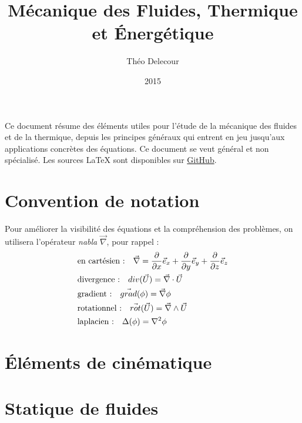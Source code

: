 \documentclass[10pt,a4paper,twocolumn,fleqn]{article}
\title{Mécanique des Fluides, Thermique et Énergétique}
\author{Théo Delecour}
\date{2015}
\begin{document}
\makeatletter

\begin{center}
    \LARGE \@title

    \Large \@author
\end{center}

\makeatother

Ce document résume des éléments utiles pour l'étude de la mécanique des fluides et de la thermique, depuis les principes généraux qui entrent en jeu jusqu'aux applications concrètes des équations. Ce document se veut général et non spécialisé. Les sources \LaTeX{} sont disponibles sur \href{https://github.com/theolamayo/flui-ther-fr}{GitHub}.



\section*{Convention de notation}
Pour améliorer la visibilité des équations et la compréhension des problèmes, on utilisera l'opérateur \textit{nabla} $\vec{\nabla}$, pour rappel :
%
\begin{align}
    \notag &\text{en cartésien :} \quad \vec{\nabla} = \frac{\partial}{\partial x} \vec{e}_x + \frac{\partial}{\partial y} \vec{e}_y + \frac{\partial}{\partial z} \vec{e}_z \\
    \notag &\text{divergence :} \quad div (\vec{U}) = \vec{\nabla} \cdot \vec{U} \\
    \notag &\text{gradient :} \quad \vec{grad} (\phi) = \vec{\nabla} \phi \\
    \notag &\text{rotationnel :} \quad \vec{rot} (\vec{U}) = \vec{\nabla} \wedge \vec{U} \\
    \notag &\text{laplacien :} \quad \Delta (\phi) = \nabla^2 \phi
\end{align}


\section{Éléments de cinématique}


\section{Statique de fluides}\label{sec:statique} %

\end{document}
